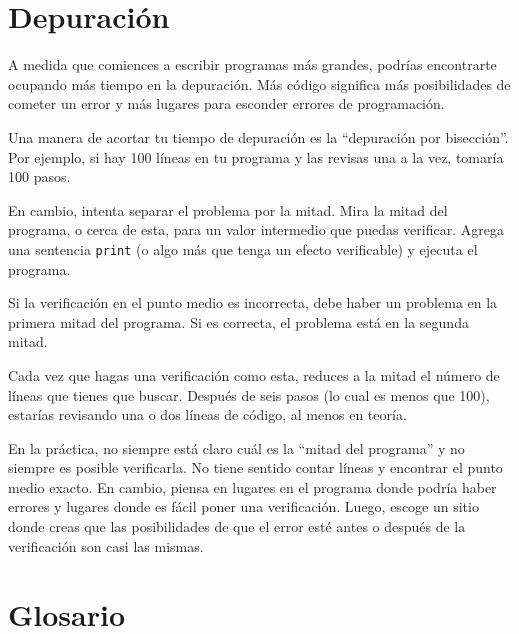 \documentclass[10pt]{book}
\begin{document}
\section{Depuración}
\label{bisectbug}

A medida que comiences a escribir programas más grandes, podrías encontrarte
ocupando más tiempo en la depuración.  Más código significa más posibilidades de
cometer un error y más lugares para esconder errores de programación.

Una manera de acortar tu tiempo de depuración es la ``depuración por bisección''.
Por ejemplo, si hay 100 líneas en tu programa y las
revisas una a la vez, tomaría 100 pasos.

En cambio, intenta separar el problema por la mitad.  Mira la mitad
del programa, o cerca de esta, para un valor intermedio que
puedas verificar.  Agrega una sentencia {\tt print} (o algo más
que tenga un efecto verificable) y ejecuta el programa.

Si la verificación en el punto medio es incorrecta, debe haber un problema en la
primera mitad del programa.  Si es correcta, el problema está
en la segunda mitad.

Cada vez que hagas una verificación como esta, reduces a la mitad el número
de líneas que tienes que buscar.  Después de seis pasos (lo cual es menos que 100),
estarías revisando una o dos líneas de código, al menos en teoría.

En la práctica, no siempre está claro cuál es
la ``mitad del programa'' y no siempre es posible
verificarla.  No tiene sentido contar líneas y encontrar el
punto medio exacto.  En cambio, piensa en lugares
en el programa donde podría haber errores y lugares donde es
fácil poner una verificación.  Luego, escoge un sitio donde
creas que las posibilidades de que el error esté antes o después
de la verificación son casi las mismas.




\section{Glosario}
\end{document}
